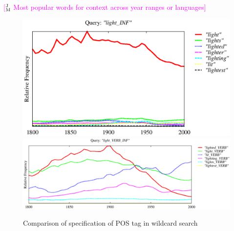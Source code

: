 \documentclass[11pt]{article}
\newcommand{\jmcomment}[1]{\textcolor{magenta}{[$^{\textsc{J}}_{\textsc{M}}$ #1]}}
\begin{document}
\jmcomment{Most popular words for context across year ranges or languages}
\begin{figure}
\includegraphics[width=.48\textwidth]{graphs/light_INF}
\includegraphics[width=.48\textwidth]{graphs/light_INF_VERB}
\caption{\label{fig:light} Comparison of specification of POS tag in wildcard search}
\end{figure}
\end{document}
